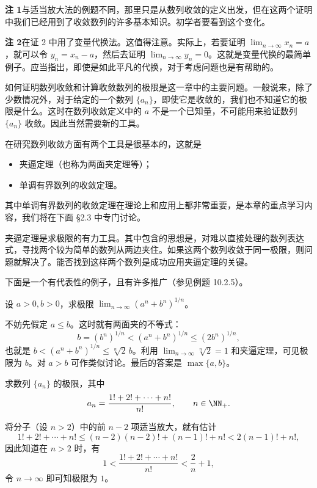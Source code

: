 \begin{xremark}
\textbf{注 1}\quad 与适当放大法的例题不同，那里只是从数列收敛的定义出发，但在这两个证明中我们已经用到了收敛数列的许多基本知识。初学者要看到这个变化。

\textbf{注 2}\quad 在证 2 中用了变量代换法。这值得注意。实际上，若要证明 $\displaystyle\lim_{n\to\infty}x_n=a$，就可以令 $y_n=x_n-a$，然后去证明 $\displaystyle\lim_{n\to\infty}y_n=0$。这就是变量代换的最简单例子。应当指出，即使是如此平凡的代换，对于考虑问题也是有帮助的。
\end{xremark}

如何证明数列收敛和计算收敛数列的极限是这一章中的主要问题。一般说来，除了少数情况外，对于给定的一个数列 $\{a_n\}$，即使它是收敛的，我们也不知道它的极限是什么。这时在数列收敛定义中的 $a$ 不是一个已知量，不可能用来验证数列 $\{a_n\}$ 收敛。因此当然需要新的工具。

在研究数列收敛方面有两个工具是很基本的，这就是
\begin{itemize}
  \item 夹逼定理（也称为两面夹定理等）；
  \item 单调有界数列的收敛定理。
\end{itemize}
其中单调有界数列的收敛定理在理论上和应用上都非常重要，是本章的重点学习内容，我们将在下面 §2.3 中专门讨论。

夹逼定理是求极限的有力工具。其中包含的思想是，对难以直接处理的数列表达式，寻找两个较为简单的数列从两边夹住。如果这两个数列收敛于同一极限，则问题就解决了。能否找到这样两个数列是成功应用夹逼定理的关键。

下面是一个有代表性的例子，且有许多推广（参见例题 10.2.5）。

\begin{xexample}[2.2.3]
设 $a>0,b>0$，求极限 $\displaystyle\lim_{n\to\infty}(a^n+b^n)^{1/n}$。
\end{xexample}
\begin{xsolution}
不妨先假定 $a\le b$。这时就有两面夹的不等式：
\[
  b=(b^n)^{1/n}<(a^n+b^n)^{1/n}\le(2b^n)^{1/n},
\]
也就是 $b<(a^n+b^n)^{1/n}\le\sqrt[n]2\,b$。利用 $\displaystyle\lim_{n\to\infty}\sqrt[n]2=1$ 和夹逼定理，可见极限为 $b$。对 $a>b$ 可作类似讨论。最后的答案是 $\max\{a,b\}$。
\end{xsolution}

\begin{xexample}[2.2.4]
求数列 $\{a_n\}$ 的极限，其中
\[
  a_n=\frac{1!+2!+\cdots+n!}{n!},\qquad n\in\NN_+.
\]
\end{xexample}
\begin{xsolution}
将分子（设 $n>2$）中的前 $n-2$ 项适当放大，就有估计
\[
  1!+2!+\cdots+n!\le(n-2)(n-2)!+(n-1)!+n!<2(n-1)!+n!,
\]
因此知道在 $n>2$ 时，有
\[
  1<\frac{1!+2!+\cdots+n!}{n!}<\frac2n+1,
\]
令 $n\to\infty$ 即可知极限为 $1$。
\end{xsolution}

